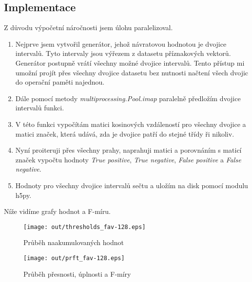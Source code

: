 \documentclass[11pt]{article}
\begin{document}
    \subsection{Implementace}\label{subsec:implementaceprahovani}
    Z důvodu výpočetní náročnosti jsem úlohu paralelizoval.

    \begin{enumerate}
        \item Nejprve jsem vytvořil generátor, jehož návratovou hodnotou je dvojice intervalů.
        Tyto intervaly jsou výřezem z datasetu příznakových vektorů.
        Generátor postupně vrátí všechny možné dvojice intervalů.
        Tento přístup mi umožní projít přes všechny dvojice datasetu bez nutnosti načtení všech dvojic do operační
        paměti najednou.
        \item Dále pomocí metody \textit{multiprocessing.Pool.imap} paralelně předložím dvojice intervalů funkci.
        \item V této funkci vypočítám matici kosinových vzdáleností pro všechny dvojice a matici značek, která udává,
        zda je dvojice patří do stejné třídy ři nikoliv.
        \item Nyní proiteruji přes všechny prahy, naprahuji matici a porovnáním s maticí značek vypočtu hodnoty
        \textit{True positive}, \textit{True negative}, \textit{False positive} a \textit{False negative}.
        \item Hodnoty pro všechny dvojice intervalů sečtu a uložím na disk pomocí modulu h5py.
    \end{enumerate}

    Níže vidíme grafy hodnot a F-míru.

    \begin{figure}[H]
        \centering
        \texttt{[image: out/thresholds\_fav-128.eps]}
        \caption{Průběh naakumulovaných hodnot}
        \label{fig:thresh}
    \end{figure}

    \newpage

    \begin{figure}[H]
        \centering
        \texttt{[image: out/prft\_fav-128.eps]}
        \caption{Průběh přesnosti, úplnosti a F-míry}
        \label{fig:prft}
    \end{figure}
\end{document}
